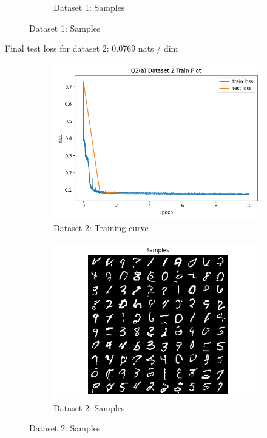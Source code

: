 \documentclass{article}
\begin{document}
\begin{enumerate}[(a)]
\begin{figure}[H]
\begin{subfigure}{0.45\textwidth}
        \caption{Dataset 1: Samples}
    \end{subfigure}
\end{figure}
Final test loss for dataset 2: 0.0769 nats / dim
\begin{figure}[H]
    \centering
    \begin{subfigure}{0.45\textwidth}
        \centering
        \includegraphics[width=\textwidth]{figures/q2_a_dset2_train_plot.png}
        \caption{Dataset 2: Training curve}
    \end{subfigure}
    \hspace{0.2in}
    \begin{subfigure}{0.45\textwidth}
        \centering
        \includegraphics[width=\textwidth]{figures/q2_a_dset2_samples.png}
        \caption{Dataset 2: Samples}
    \end{subfigure}
\end{figure}


\end{enumerate}
\end{document}
